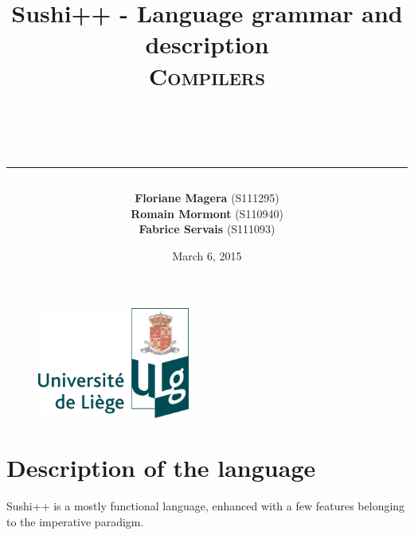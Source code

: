 \documentclass[a4paper,titlepage]{article}
\begin{document}
\begin{titlepage}

\begin{figure}
\centering
\includegraphics[width=5cm]{logo-ulg.png}
\end{figure}



\title{
\vspace{0.2cm}
\LARGE{\textbf{Sushi++ - Language grammar and description}} \\ \textsc{Compilers}
\author{\textbf{Floriane Magera} \small{(S111295})\\\textbf{Romain Mormont} \small{(S110940})\\\textbf{Fabrice Servais} \small{(S111093})}\\
\date{March 6, 2015}
\rule{15cm}{1.5pt}
}

\end{titlepage}

\pagestyle{fancy}

\maketitle
  
\section{Description of the language}

Sushi++ is a mostly functional language, enhanced with a few features belonging to the imperative paradigm.
\end{document}
